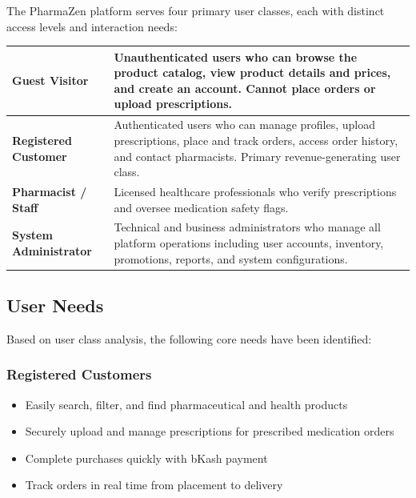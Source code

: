 \documentclass[12pt, a4paper]{article}
\begin{document}
The PharmaZen platform serves four primary user classes, each with distinct access levels and interaction needs:

\vspace{8pt}
\renewcommand{\arraystretch}{1.5}
\begin{tabular}{|L{3.2cm}|L{12cm}|}
  \hline
  \textbf{\small\color{darkgreen}Guest Visitor} & \small Unauthenticated users who can browse the product catalog, view product details and prices, and create an account. Cannot place orders or upload prescriptions. \\
  \hline
  \textbf{\small\color{darkgreen}Registered Customer} & \small Authenticated users who can manage profiles, upload prescriptions, place and track orders, access order history, and contact pharmacists. Primary revenue-generating user class. \\
  \hline
  \textbf{\small\color{darkgreen}Pharmacist / Staff} & \small Licensed healthcare professionals who verify prescriptions and oversee medication safety flags. \\
  \hline
  \textbf{\small\color{darkgreen}System Administrator} & \small Technical and business administrators who manage all platform operations including user accounts, inventory, promotions, reports, and system configurations. \\
  \hline
\end{tabular}

\subsection{User Needs}

Based on user class analysis, the following core needs have been identified:

\subsubsection{Registered Customers}
\begin{itemize}[leftmargin=1.5em, itemsep=3pt]
  \item Easily search, filter, and find pharmaceutical and health products
  \item Securely upload and manage prescriptions for prescribed medication orders
  \item Complete purchases quickly with bKash payment
  \item Track orders in real time from placement to delivery
\end{itemize}
\end{document}

